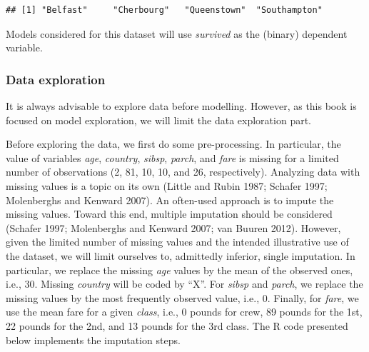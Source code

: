 \documentclass[12pt,]{krantz}
\newenvironment{Shaded}{\begin{snugshade}}{\end{snugshade}}
\newcommand{\KeywordTok}[1]{\textcolor[rgb]{0.13,0.29,0.53}{\textbf{#1}}}
\newcommand{\NormalTok}[1]{#1}
\newcommand{\OperatorTok}[1]{\textcolor[rgb]{0.81,0.36,0.00}{\textbf{#1}}}
\begin{document}
\begin{Shaded}
\end{Shaded}

\begin{verbatim}
## [1] "Belfast"     "Cherbourg"   "Queenstown"  "Southampton"
\end{verbatim}

Models considered for this dataset will use \emph{survived} as the (binary) dependent variable.

\hypertarget{exploration-titanic}{%
\subsubsection{Data exploration}\label{exploration-titanic}}

It is always advisable to explore data before modelling. However, as this book is focused on model exploration, we will limit the data exploration part.

Before exploring the data, we first do some pre-processing. In particular, the value of variables \emph{age}, \emph{country}, \emph{sibsp}, \emph{parch}, and \emph{fare} is missing for a limited number of observations (2, 81, 10, 10, and 26, respectively). Analyzing data with missing values is a topic on its own (Little and Rubin 1987; Schafer 1997; Molenberghs and Kenward 2007). An often-used approach is to impute the missing values. Toward this end, multiple imputation should be considered (Schafer 1997; Molenberghs and Kenward 2007; van Buuren 2012). However, given the limited number of missing values and the intended illustrative use of the dataset, we will limit ourselves to, admittedly inferior, single imputation. In particular, we replace the missing \emph{age} values by the mean of the observed ones, i.e., 30. Missing \emph{country} will be coded by ``X''. For \emph{sibsp} and \emph{parch}, we replace the missing values by the most frequently observed value, i.e., 0. Finally, for \emph{fare}, we use the mean fare for a given \emph{class}, i.e., 0 pounds for crew, 89 pounds for the 1st, 22 pounds for the 2nd, and 13 pounds for the 3rd class. The R code presented below implements the imputation steps.
\end{document}
